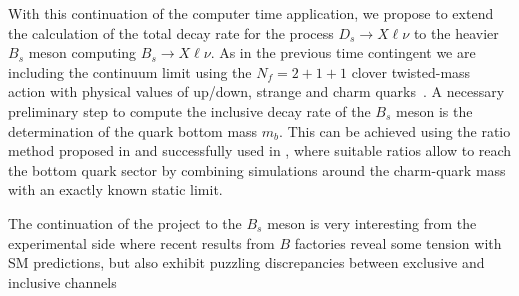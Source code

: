 With this continuation of the computer time application, we propose to extend
the calculation of the total decay rate for the process $D_s \to X\ell\nu$ to the
heavier $B_s$ meson computing  $B_s \to X\ell\nu$.
As in the previous time contingent we are including the continuum limit
using the $N_f=2+1+1$ clover twisted-mass action with physical
values of up/down, strange and charm
quarks~\cite{ExtendedTwistedMass:2021qui,ExtendedTwistedMass:2021gbo,ExtendedTwistedMass:2022jpw}.
A necessary preliminary step to compute the inclusive decay rate of the $B_s$
meson is the determination of the quark bottom mass $m_b$. This can be
achieved using the ratio method proposed in \cite{ETM:2009sed}
and successfully used in \cite{ETM:2016nbo}, where suitable ratios allow
to reach the bottom quark sector by combining simulations around the
charm-quark mass with an exactly known static limit.


The continuation of the project to the $B_s$ meson is very interesting from the
experimental side  where recent results from $B$ factories reveal some tension with
SM predictions, but also exhibit puzzling discrepancies between exclusive and
inclusive channels~\cite{ParticleDataGroup:2020ssz, HFLAV:2019otj, Gambino:2019sif}

